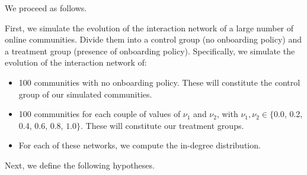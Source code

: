 \documentclass{bmcart}
\begin{document}

We proceed as follows.

First, we simulate the evolution of the interaction network of a large number of online communities. Divide them into a control group (no onboarding policy) and a treatment group (presence of onboarding policy). Specifically, we simulate the evolution of the interaction network of:

\begin{itemize}
\item 100 communities with no onboarding policy. These will constitute the control group of our simulated communities. 
\item 100 communities for each couple of values of $\nu_1$  and $\nu_2$, with $\nu_1, \nu_2 \in \{0.0$, 0.2, 0.4, 0.6, 0.8, $1.0\}$. These will constitute our treatment groups.
\item For each of these networks, we compute the in-degree distribution.
\end{itemize}

Next, we define the following hypotheses. 
\end{document}
